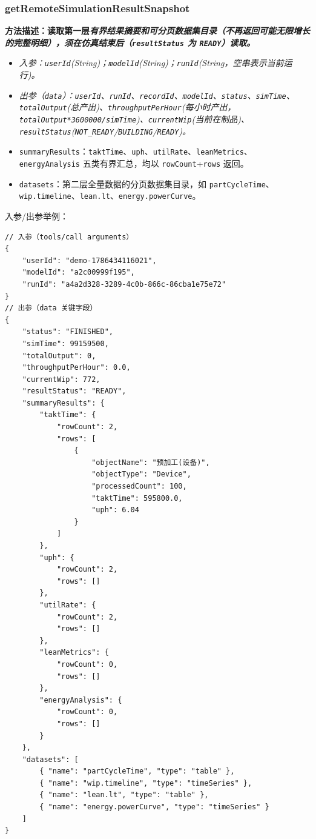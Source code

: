 \subsubsection{getRemoteSimulationResultSnapshot}
\bf{方法描述}：读取第一层\it{有界结果摘要}和可分页数据集目录（不再返回可能无限增长的完整明细），须在仿真结束后（\texttt{resultStatus} 为 \texttt{READY}）读取。
\begin{itemize}
	\item \it{入参}：\texttt{userId}(String)；\texttt{modelId}(String)；\texttt{runId}(String，空串表示当前运行)。
	\item \it{出参}（\texttt{data}）：\texttt{userId}、\texttt{runId}、\texttt{recordId}、\texttt{modelId}、\texttt{status}、\texttt{simTime}、\texttt{totalOutput}(总产出)、\texttt{throughputPerHour}(每小时产出，\texttt{totalOutput*3600000/simTime})、\texttt{currentWip}(当前在制品)、\texttt{resultStatus}(\texttt{NOT\_READY}/\texttt{BUILDING}/\texttt{READY})。
	\item \texttt{summaryResults}：\texttt{taktTime}、\texttt{uph}、\texttt{utilRate}、\texttt{leanMetrics}、\texttt{energyAnalysis} 五类有界汇总，均以 \texttt{rowCount}+\texttt{rows} 返回。
	\item \texttt{datasets}：第二层全量数据的分页数据集目录，如 \texttt{partCycleTime}、\texttt{wip.timeline}、\texttt{lean.lt}、\texttt{energy.powerCurve}。
\end{itemize}
入参/出参举例：
\begin{lstlisting}
// 入参（tools/call arguments）
{
    "userId": "demo-1786434116021",
    "modelId": "a2c00999f195",
    "runId": "a4a2d328-3289-4c0b-866c-86cba1e75e72"
}
// 出参（data 关键字段）
{
    "status": "FINISHED",
    "simTime": 99159500,
    "totalOutput": 0,
    "throughputPerHour": 0.0,
    "currentWip": 772,
    "resultStatus": "READY",
    "summaryResults": {
        "taktTime": {
            "rowCount": 2,
            "rows": [
                {
                    "objectName": "预加工(设备)",
                    "objectType": "Device",
                    "processedCount": 100,
                    "taktTime": 595800.0,
                    "uph": 6.04
                }
            ]
        },
        "uph": {
            "rowCount": 2,
            "rows": []
        },
        "utilRate": {
            "rowCount": 2,
            "rows": []
        },
        "leanMetrics": {
            "rowCount": 0,
            "rows": []
        },
        "energyAnalysis": {
            "rowCount": 0,
            "rows": []
        }
    },
    "datasets": [
        { "name": "partCycleTime", "type": "table" },
        { "name": "wip.timeline", "type": "timeSeries" },
        { "name": "lean.lt", "type": "table" },
        { "name": "energy.powerCurve", "type": "timeSeries" }
    ]
}
\end{lstlisting}\vspace{-30pt}

